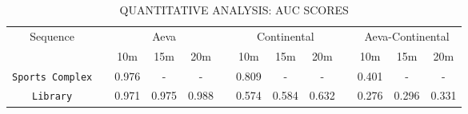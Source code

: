 \begin{table}[t]
\centering
\caption{QUANTITATIVE ANALYSIS: AUC SCORES}
\begin{adjustbox}{width=1\linewidth}
{
\begin{tabular}{c|cccccccccccc}
\toprule
\multirow{2}{*}{Sequence} &
 &
   \multicolumn{3}{c}{Aeva}
 &
 &
  \multicolumn{3}{c}{Continental}
 &
 &
  \multicolumn{3}{c}{Aeva-Continental}
  \\ \cline{3-5} \cline{7-9} \cline{11-13} \rule{0pt}{2.5ex}
  &
  &
  \unit{10}{m} &
  \unit{15}{m} &
  \unit{20}{m} &
  &
  \unit{10}{m} &
  \unit{15}{m} &
  \unit{20}{m} &
  &
  \unit{10}{m} &
  \unit{15}{m} &
  \unit{20}{m}
\\ 
\midrule
\multirow{1}{*}{\texttt{Sports Complex}}
& & 0.976  & -  & -  &   & 0.809 & - & - & & 0.401 & - & -\\
\midrule
\multirow{1}{*}{\texttt{Library}}
& & 0.971 & 0.975 & 0.988   &  & 0.574 & 0.584 & 0.632 & & 0.276 & 0.296 & 0.331 \\
\bottomrule
\end{tabular}
}
\end{adjustbox}
\label{tab:pr}
\vspace{-2mm}
\end{table}

